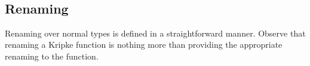 \documentclass[authoryear, acmsmall, screen, review, nonacm]{acmart}
\begin{document}
\begin{code}[hide]
\>[16]\AgdaSpace{}%
\AgdaSpace{}%
\AgdaOperator{\AgdaInductiveConstructor{,}}\AgdaSpace{}%
%
\>[4992I]\AgdaSymbol{\{}\AgdaSpace{}%
%
\>[37]\AgdaSpace{}%
\<%
\\
\>[.][@{}l@{}]\<[4992I]%
\>[26]\AgdaSymbol{;}\AgdaSpace{}%
\AgdaSymbol{(}\AgdaSpace{}%
\AgdaSymbol{)}\AgdaSpace{}%
\AgdaSpace{}%
\AgdaSpace{}%
\AgdaSpace{}%
\AgdaSymbol{\}}\<%
\\
\>[0]\<%
\\
\>[0]\AgdaSpace{}%
\AgdaSymbol{:}\AgdaSpace{}%
\AgdaSpace{}%
\AgdaSymbol{(}\AgdaSpace{}%
\AgdaSpace{}%
\AgdaSymbol{)}\<%
\\
\>[0]\AgdaSpace{}%
\AgdaSymbol{=}\AgdaSpace{}%
\AgdaSpace{}%
\AgdaOperator{\AgdaInductiveConstructor{,}}\AgdaSpace{}%
\AgdaSpace{}%
\AgdaSymbol{()}\<%
\end{code}


\subsection{Renaming}

Renaming over normal types is defined in a straightforward manner. Observe that renaming a Kripke function is nothing more than providing the appropriate renaming to the function.

\begin{code}%
\>[0]\AgdaSpace{}%
\AgdaSymbol{:}\AgdaSpace{}%
\AgdaSpace{}%
\AgdaSpace{}%
\AgdaSpace{}%
\AgdaSpace{}%
\AgdaSpace{}%
\AgdaSpace{}%
\AgdaSpace{}%
\AgdaSpace{}%
\AgdaSpace{}%
\AgdaSpace{}%
\AgdaSpace{}%
\AgdaSpace{}%
\<%
\\
\>[0]\AgdaSpace{}%
\AgdaSymbol{\{}\AgdaSymbol{\}}\AgdaSpace{}%
\AgdaSpace{}%
\AgdaSpace{}%
\AgdaSymbol{\{}\AgdaSymbol{\}}\AgdaSpace{}%
\AgdaSymbol{=}\AgdaSpace{}%
\AgdaSpace{}%
\AgdaSpace{}%
\AgdaSpace{}%
\AgdaSpace{}%
\AgdaSymbol{(}\AgdaSpace{}%
\AgdaSpace{}%
\AgdaSymbol{)}\<%
\end{code}
\end{document}
